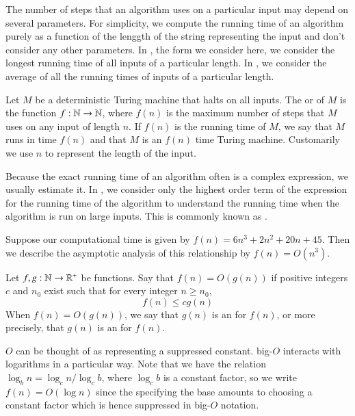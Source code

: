 \documentclass[12pt, a4paper, oneside, openright, titlepage]{book}
\begin{document}
\begin{appendices}
        The number of steps that an algorithm uses on a particular input may depend on several parameters. For simplicity, we compute the running time of an algorithm purely as a function of the lenggth of the string representing the input and don't consider any other parameters. In , the form we consider here, we consider the longest running time of all inputs of a particular length. In , we consider the average of all the running times of inputs of a particular length.

        \begin{defn}
            Let $M$ be a deterministic Turing machine that halts on all inputs. The  or  of $M$ is the function $f:\mathbb N\rightarrow \mathbb N$, where $f(n)$ is the maximum number of steps that $M$ uses on any input of length $n$. If $f(n)$ is the running time of $M$, we say that $M$ runs in time $f(n)$ and that $M$ is an $f(n)$ time Turing machine. Customarily we use $n$ to represent the length of the input.
        \end{defn}

        Because the exact running time of an algorithm often is a complex expression, we usually estimate it. In , we consider only the highest order term of the expression for the running time of the algorithm to understand the running time when the algorithm is run on large inputs. This is commonly known as . 

        \begin{eg}
            Suppose our computational time is given by $f(n) = 6n^3 + 2n^2+20n+45$. Then we describe the asymptotic analysis of this relationship by $f(n) = O(n^3)$.
        \end{eg}

        \begin{defn}
            Let $f,g:\mathbb N\rightarrow\mathbb R^+$ be functions. Say that $f(n) = O(g(n))$ if positive integers $c$ and $n_0$ exist such that for every integer $n \geq n_0$, \begin{equation*}
                f(n) \leq cg(n)
            \end{equation*}
            When $f(n) = O(g(n))$, we say that $g(n)$ is an  for $f(n)$, or more precisely, that $g(n)$ is an  for $f(n)$.
        \end{defn}

        $O$ can be thought of as representing a suppressed constant. big-$O$ interacts with logarithms in a particular way. Note that we have the relation $\log_bn = \log_cn/\log_cb$, where $\log_cb$ is a constant factor, so we write $f(n) = O(\log n)$ since the specifying the base amounts to choosing a constant factor which is hence suppressed in big-$O$ notation.


\end{appendices}
\end{document}
